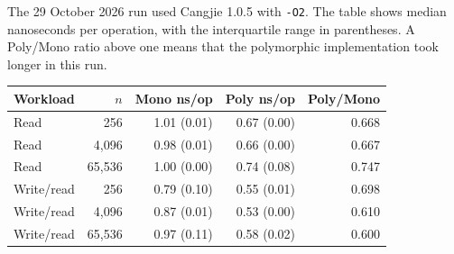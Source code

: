 The 29 October 2026 run used Cangjie 1.0.5 with \texttt{-O2}. The
table shows median nanoseconds per operation, with the interquartile
range in parentheses. A Poly/Mono ratio above one means that the
polymorphic implementation took longer in this run.
\begin{center}
\small
\begin{tabular}{lrrrr}
\hline
Workload & $n$ & Mono ns/op & Poly ns/op & Poly/Mono \\
\hline
Read & 256 & 1.01 (0.01) & 0.67 (0.00) & 0.668 \\
Read & 4,096 & 0.98 (0.01) & 0.66 (0.00) & 0.667 \\
Read & 65,536 & 1.00 (0.00) & 0.74 (0.08) & 0.747 \\
Write/read & 256 & 0.79 (0.10) & 0.55 (0.01) & 0.698 \\
Write/read & 4,096 & 0.87 (0.01) & 0.53 (0.00) & 0.610 \\
Write/read & 65,536 & 0.97 (0.11) & 0.58 (0.02) & 0.600 \\
\hline
\end{tabular}
\end{center}

